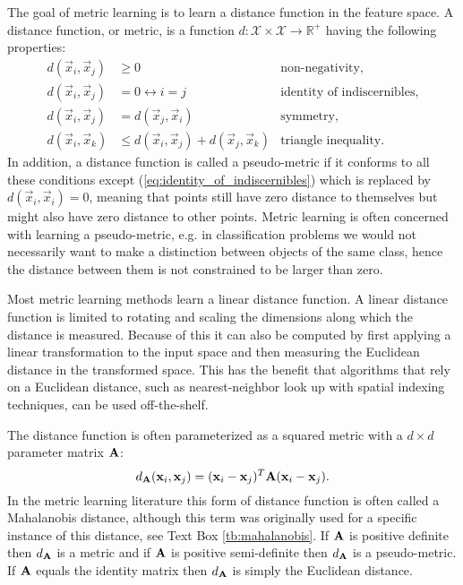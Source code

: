 The goal of metric learning is to learn a distance function in the feature space. A distance function, or metric, is a function $d: \mathcal{X} \times \mathcal{X} \rightarrow \mathbb{R}^{+}$ having the following properties:
\begin{subequations}
\begin{align}
        d(\vec{x}_i, \vec{x}_j) & \geq 0 &  \text{non-negativity}, \label{eq:non-negativity}\\
        d(\vec{x}_i, \vec{x}_j) & = 0 \leftrightarrow i = j & \text{identity of indiscernibles}, \label{eq:identity_of_indiscernibles} \\
        d(\vec{x}_i, \vec{x}_j) & = d(\vec{x}_j, \vec{x}_i) &  \text{symmetry}, \label{eq:symmetry}\\
        d(\vec{x}_i, \vec{x}_k) & \leq d(\vec{x}_i, \vec{x}_j) + d(\vec{x}_j, \vec{x}_k) &  \text{triangle inequality}. \label{eq:triangle_unequality}
\end{align}
\end{subequations}
In addition, a distance function is called a pseudo-metric if it conforms to all these conditions except (\ref{eq:identity_of_indiscernibles}) which is replaced by $d(\vec{x}_i, \vec{x}_i) = 0$, meaning that points still have zero distance to themselves but might also have zero distance to other points. Metric learning is often concerned with learning a pseudo-metric, e.g. in classification problems we would not necessarily want to make a distinction between objects of the same class, hence the distance between them is not constrained to be larger than zero.

Most metric learning methods learn a linear distance function. A linear distance function is limited to rotating and scaling the dimensions along which the distance is measured. Because of this it can also be computed by first applying a linear transformation to the input space and then measuring the Euclidean distance in the transformed space. This has the benefit that algorithms that rely on a Euclidean distance, such as nearest-neighbor look up with spatial indexing techniques, can be used off-the-shelf.

The distance function is often parameterized as a squared metric with a $d \times d$ parameter matrix $\mathbf{A}$:
\begin{equation}
d_{\mathbf{A}}(\mathbf{x}_i, \mathbf{x}_j) = (\mathbf{x}_i - \mathbf{x}_j)^T\mathbf{A}(\mathbf{x}_i - \mathbf{x}_j).
\end{equation}
In the metric learning literature this form of distance function is often called a Mahalanobis distance, although this term was originally used for a specific instance of this distance, see Text Box \ref{tb:mahalanobis}. If $\mathbf{A}$ is positive definite then $d_{\mathbf{A}}$ is a metric and if $\mathbf{A}$ is positive semi-definite then $d_{\mathbf{A}}$ is a pseudo-metric. If $\mathbf{A}$ equals the identity matrix then $d_{\mathbf{A}}$ is simply the Euclidean distance.

